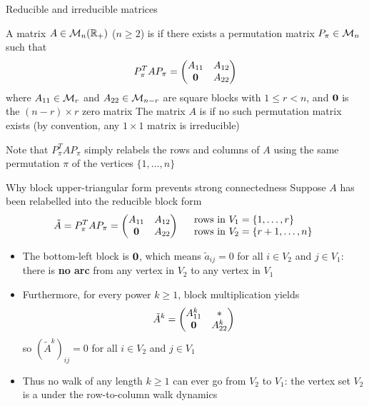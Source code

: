 \documentclass[aspectratio=169]{beamer}\usepackage[]{graphicx}\usepackage[]{xcolor}
\begin{document}
\begin{frame}{Reducible and irreducible matrices}
\begin{importantdefinition}
A matrix $A \in \mathcal{M}_n(\mathbb{R}_+)$ ($n \ge 2$) is  if there exists a permutation matrix $P_\pi \in \mathcal{M}_n$ such that
\[
P_\pi^T A P_\pi = \begin{pmatrix}
A_{11} & A_{12} \\
\b0 & A_{22}
\end{pmatrix}
\]
where $A_{11} \in \mathcal{M}_r$ and $A_{22} \in \mathcal{M}_{n-r}$ are square blocks with $1 \le r < n$, and $\b0$ is the $(n-r) \times r$ zero matrix
\vskip0.2cm
The matrix $A$ is  if no such permutation matrix exists (by convention, any $1 \times 1$ matrix is irreducible)
\end{importantdefinition}
\vfill
Note that $P_\pi^T A P_\pi$ simply relabels the rows and columns of $A$ using the same permutation $\pi$ of the vertices $\{1, \ldots, n\}$
\end{frame}

\begin{frame}{Why block upper-triangular form prevents strong connectedness}
Suppose $A$ has been relabelled into the reducible block form
\[
\tilde{A} = P_\pi^T A P_\pi = \begin{pmatrix}
A_{11} & A_{12} \\
\b0 & A_{22}
\end{pmatrix}
\quad
\begin{array}{l}
\text{rows in } V_1 = \{1, \ldots, r\} \\
\text{rows in } V_2 = \{r+1, \ldots, n\}
\end{array}
\]
\vfill
\begin{itemize}
\item The bottom-left block is $\b0$, which means $\tilde{a}_{ij} = 0$ for all $i \in V_2$ and $j \in V_1$: there is \textbf{no arc} from any vertex in $V_2$ to any vertex in $V_1$
\item Furthermore, for every power $k \ge 1$, block multiplication yields
\[
\tilde{A}^k = \begin{pmatrix}
A_{11}^k & * \\
\b0 & A_{22}^k
\end{pmatrix}
\]
so $(\tilde{A}^k)_{ij} = 0$ for all $i \in V_2$ and $j \in V_1$
\item Thus no walk of any length $k \ge 1$ can ever go from $V_2$ to $V_1$: the vertex set $V_2$ is a  under the row-to-column walk dynamics
\end{itemize}
\end{frame}
\end{document}
